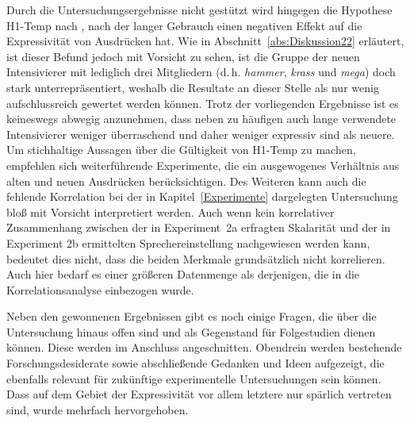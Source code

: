 

Durch die Untersuchungsergebnisse nicht gestützt wird hingegen die Hypothese \mbox{H1-Temp} nach \mbox{\citet[59]{Tobler.1868}}, nach der langer Gebrauch einen negativen Effekt auf die Expressivität von Ausdrücken hat. Wie in \mbox{Abschnitt \ref{abs:Diskussion22}} erläutert, ist dieser Befund jedoch mit Vorsicht zu sehen, ist die Gruppe der neuen Intensivierer mit lediglich drei Mitgliedern (d.\,h. \textit{hammer}, \textit{krass} und \textit{mega}) doch stark unterrepräsentiert, weshalb die Resultate an dieser Stelle als nur wenig aufschlussreich gewertet werden können. Trotz der vorliegenden Ergebnisse ist es keineswegs abwegig anzunehmen, dass neben zu häufigen auch lange verwendete Intensivierer weniger überraschend und daher weniger expressiv sind als neuere. Um stichhaltige Aussagen über die Gültigkeit von \mbox{H1-Temp} zu machen, empfehlen sich weiterführende Experimente, die ein ausgewogenes Verhältnis aus alten und neuen Ausdrücken berücksichtigen. Des Weiteren kann auch die fehlende Korrelation bei der in \mbox{Kapitel \ref{Experimente}} dargelegten Untersuchung bloß mit Vorsicht interpretiert werden. Auch wenn kein korrelativer Zusammenhang zwischen der in \mbox{Experiment 2a} erfragten Skalarität und der in Experiment 2b ermittelten Sprechereinstellung nachgewiesen werden kann, bedeutet dies nicht, dass die beiden Merkmale grundsätzlich nicht korrelieren. Auch hier bedarf es einer größeren Datenmenge als derjenigen, die in die Korrelationsanalyse einbezogen wurde.


Neben den gewonnenen Ergebnissen gibt es noch einige Fragen, die über die Untersuchung hinaus offen sind und als Gegenstand für Folgestudien dienen können. Diese werden im Anschluss angeschnitten. Obendrein werden bestehende Forschungsdesiderate sowie abschließende Gedanken und Ideen aufgezeigt, die ebenfalls relevant für zukünftige experimentelle Untersuchungen sein können. Dass auf dem Gebiet der Expressivität vor allem letztere nur spärlich vertreten sind, wurde mehrfach hervorgehoben.


